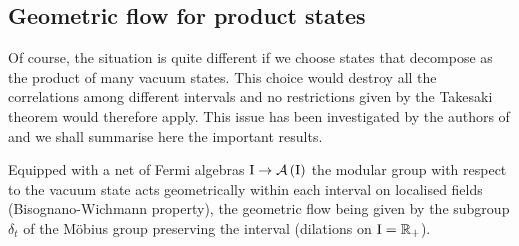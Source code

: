  
 
 \subsection{Geometric flow for product states}
 \label{product states}
 Of course, the situation is quite different if we choose
 states that decompose as the product of many vacuum states.
 This choice would destroy all the correlations among different
 intervals and no restrictions given by the Takesaki theorem
 would therefore apply. This issue has been investigated by 
 the authors of \cite{LMR:2009} and we shall summarise 
 here the important results. 
 
 Equipped with a net of Fermi algebras $\textrm{I}\to\mathcal{A}\left(\textrm{I}\right)$
 the modular group with respect to the vacuum state
 acts geometrically within each interval on localised fields 
 (Bisognano-Wichmann property), the geometric flow being
 given by the subgroup $\delta_t$ of the M\"obius group preserving
 the interval (dilations on $\textrm{I}=\mathbb{R}_+$).
 
